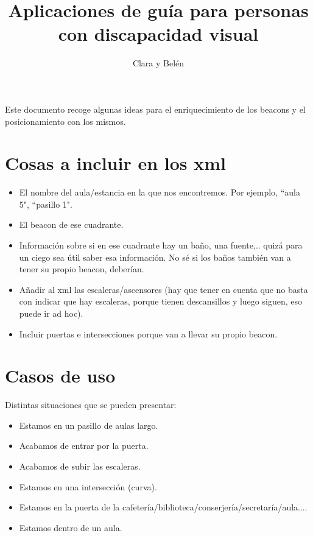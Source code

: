 \documentclass{article}
\title{\Huge Aplicaciones de guía para personas con discapacidad visual}
\author{Clara y Belén}
\begin{document}
	
	
	Este documento recoge algunas ideas para el enriquecimiento de los beacons y el posicionamiento con los mismos.
	
	\section{Cosas a incluir en los xml}
	
	\begin{itemize}
		\item El nombre del aula/estancia en la que nos encontremos. Por ejemplo, ``aula 5", ``pasillo 1".
		\item El beacon de ese cuadrante.
		\item Información sobre si en ese cuadrante hay un baño, una fuente,.. quizá para un ciego sea útil saber esa información. No sé si los baños también van a tener su propio beacon, deberían. 
		\item Añadir al xml las escaleras/ascensores (hay que tener en cuenta que no basta con indicar que hay escaleras, porque tienen descansillos y luego siguen, eso puede ir ad hoc).
		\item Incluir puertas e intersecciones porque van a llevar su propio beacon. 
		
	\end{itemize}

	\section{Casos de uso}
	Distintas situaciones que se pueden presentar:
	
	\begin{itemize}
		\item Estamos en un pasillo de aulas largo. 
		\item Acabamos de entrar por la puerta. 
		\item Acabamos de subir las escaleras.
		\item Estamos en una intersección (curva).
		\item Estamos en la puerta de la cafetería/biblioteca/conserjería/secretaría/aula....
		\item Estamos dentro de un aula.
		
	\end{itemize}
	
	
 
	
\end{document}
